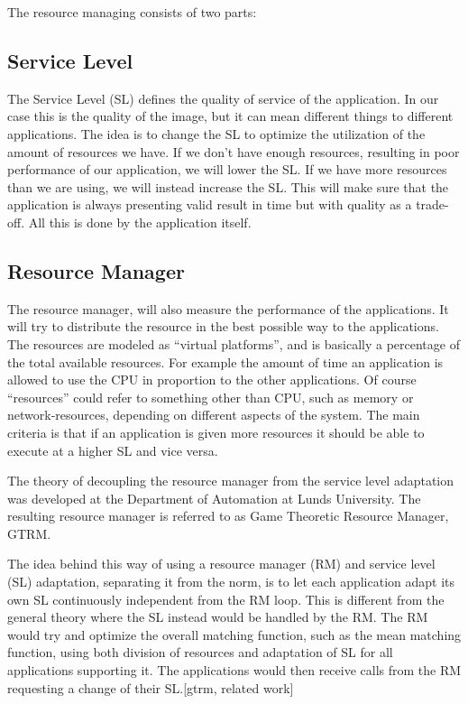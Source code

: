 \documentclass{LTHthesis}
\begin{document}
The resource managing consists of two parts:
\subsection{Service Level}
The Service Level (SL) defines the quality of service of the application. In our case this is the quality of the image, but it can mean different things to different applications. The idea is to change the SL to optimize the utilization of the amount of resources we have. If we don’t have enough resources, resulting in poor performance of our application, we will lower the SL. If we have more resources than we are using, we will instead increase the SL. This will make sure that the application is always presenting valid result in time but with quality as a trade-off. All this is done by the application itself.

\subsection{Resource Manager}
The resource manager, will also measure the performance of the applications. It will try to distribute the resource in the best possible way to the applications. The resources are modeled as “virtual platforms”, and is basically a percentage of the total available resources. For example the amount of time an application is allowed to use the CPU in proportion to the other applications. Of course “resources” could refer to something other than CPU, such as memory or network-resources, depending on different aspects of the system. The main criteria is that if an application is given more resources it should be able to execute at a higher SL and vice versa.

The theory of decoupling the resource manager from the service level adaptation was developed at the Department of Automation at Lunds University. The resulting resource manager is referred to as Game Theoretic Resource Manager, GTRM. 

The idea behind this way of using a resource manager (RM) and service level (SL) adaptation, separating it from the norm, is to let each application adapt its own SL continuously independent from the RM loop. This is different from the general theory where the SL instead would be handled by the RM. The RM would try and optimize the overall matching function, such as the mean matching function,  using both division of resources and adaptation of SL for all applications supporting it. The applications would then receive calls from the RM requesting a change of their SL.[gtrm, related work]
\end{document}
